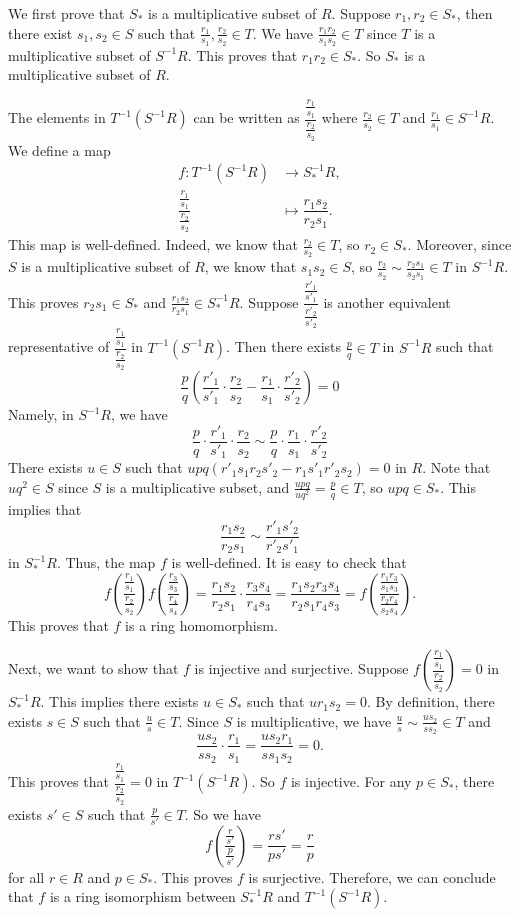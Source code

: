 \documentclass[letterpaper, 12pt]{article}
\begin{document}
\begin{solution}
We first prove that \(S_*\) is a multiplicative subset of \(R\). Suppose \(r_1,r_2\in S_*\), then there exist \(s_1,s_2\in S\) such that \(\frac{r_1}{s_1},\frac{r_2}{s_2}\in T\). We have \(\frac{r_1r_2}{s_1s_2}\in T\) since \(T\) is a multiplicative subset of \(S^{-1}R\). This proves that \(r_1r_2\in S_*\). So \(S_*\) is a multiplicative subset of \(R\).

The elements in \(T^{-1}(S^{-1}R)\) can be written as \(\dfrac{\frac{r_1}{s_1}}{\frac{r_2}{s_2}}\) where \(\frac{r_2}{s_2}\in T\) and \(\frac{r_1}{s_1}\in S^{-1}R\). We define a map 
\begin{align*}
    f: T^{-1}(S^{-1}R)&\rightarrow S_*^{-1}R,\\
       \dfrac{\frac{r_1}{s_1}}{\frac{r_2}{s_2}}&\mapsto \dfrac{r_1s_2}{r_2s_1}.
\end{align*}
This map is well-defined. Indeed, we know that \(\frac{r_2}{s_2}\in T\), so \(r_2\in S_*\). Moreover, since \(S\) is a multiplicative subset of \(R\), we know that \(s_1s_2\in S\), so \(\frac{r_2}{s_2}\sim \frac{r_2s_1}{s_2s_1}\in T\) in \(S^{-1}R\). This proves \(r_2s_1\in S_*\) and \(\frac{r_1s_2}{r_2s_1}\in S_*^{-1}R\). Suppose \(\dfrac{\frac{r'_1}{s'_1}}{\frac{r'_2}{s'_2}}\) is another equivalent representative of \(\dfrac{\frac{r_1}{s_1}}{\frac{r_2}{s_2}}\) in \(T^{-1}(S^{-1}R)\). Then there exists \(\frac{p}{q}\in T\) in \(S^{-1}R\) such that  
\[\frac{p}{q}(\frac{r'_1}{s'_1}\cdot \frac{r_2}{s_2}-\frac{r_1}{s_1}\cdot\frac{r'_2}{s'_2})=0\]
Namely, in \(S^{-1}R\), we have 
\[\frac{p}{q}\cdot\frac{r'_1}{s'_1}\cdot \frac{r_2}{s_2}\sim \frac{p}{q}\cdot\frac{r_1}{s_1}\cdot\frac{r'_2}{s'_2}\]
There exists \(u\in S\) such that \(upq(r'_1s_1r_2s'_2-r_1s'_1r'_2s_2)=0\) in \(R\). Note that \(uq^2\in S\) since \(S\) is a multiplicative subset, and \(\frac{upq}{uq^2}=\frac{p}{q}\in T\), so \(upq\in S_*\). This implies that 
\[\frac{r_1s_2}{r_2s_1}\sim \frac{r'_1s'_2}{r'_2s'_1}\]
in \(S_*^{-1}R\). Thus, the map \(f\) is well-defined. It is easy to check that 
\[f(\dfrac{\frac{r_1}{s_1}}{\frac{r_2}{s_2}})f(\dfrac{\frac{r_3}{s_3}}{\frac{r_4}{s_4}})=\frac{r_1s_2}{r_2s_1}\cdot \frac{r_3s_4}{r_4s_3}=\frac{r_1s_2r_3s_4}{r_2s_1r_4s_3}=f(\dfrac{\frac{r_1r_3}{s_1s_3}}{\frac{r_2r_4}{s_2s_4}}).\]
This proves that \(f\) is a ring homomorphism.

Next, we want to show that \(f\) is injective and surjective. Suppose \(f(\dfrac{\frac{r_1}{s_1}}{\frac{r_2}{s_2}})=0\) in \(S_*^{-1}R\). This implies there exists \(u\in S_*\) such that \(ur_1s_2=0\). By definition, there exists \(s\in S\) such that \(\frac{u}{s}\in T\). Since \(S\) is multiplicative, we have \(\frac{u}{s}\sim \frac{us_2}{ss_2}\in T\) and 
\[\frac{us_2}{ss_2}\cdot \frac{r_1}{s_1}=\frac{us_2r_1}{ss_1s_2}=0.\]
This proves that \(\dfrac{\frac{r_1}{s_1}}{\frac{r_2}{s_2}}=0\) in \(T^{-1}(S^{-1}R)\). So \(f\) is injective. For any \(p\in S_*\), there exists \(s'\in S\) such that \(\frac{p}{s'}\in T\). So we have 
\[f(\dfrac{\frac{r}{s'}}{\frac{p}{s'}})=\frac{rs'}{ps'}=\frac{r}{p}\]
for all \(r\in R\) and \(p\in S_*\). This proves \(f\) is surjective. Therefore, we can conclude that \(f\) is a ring isomorphism between \(S_*^{-1}R\) and \(T^{-1}(S^{-1}R)\).
\end{solution}
\end{document}
